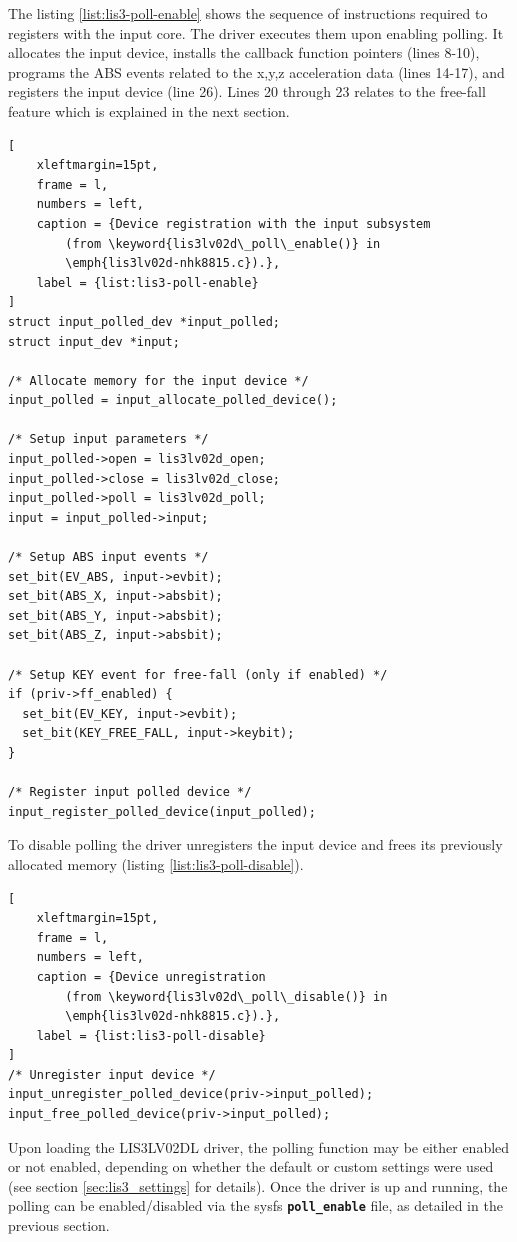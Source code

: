 \documentclass[a4paper,10pt]{article}
\newcommand{\keyword}[1]{\texttt{\textbf{#1}}}
\begin{document}
\begin{multicols}{2}
The listing \ref{list:lis3-poll-enable} shows the sequence of instructions
required to registers with the input core. The driver executes them upon
enabling polling. It allocates the input device, installs the callback
function pointers (lines 8-10), programs the ABS events related to the x,y,z
acceleration data (lines 14-17), and registers the input device (line 26).
Lines 20 through 23 relates to the free-fall feature which is explained in
the next section.

\begin{lstlisting}[
	xleftmargin=15pt,
	frame = l,
	numbers = left,
	caption = {Device registration with the input subsystem
		(from \keyword{lis3lv02d\_poll\_enable()} in
		\emph{lis3lv02d-nhk8815.c}).},
	label = {list:lis3-poll-enable}
]
struct input_polled_dev *input_polled;
struct input_dev *input;

/* Allocate memory for the input device */
input_polled = input_allocate_polled_device();

/* Setup input parameters */
input_polled->open = lis3lv02d_open;
input_polled->close = lis3lv02d_close;
input_polled->poll = lis3lv02d_poll;
input = input_polled->input;

/* Setup ABS input events */
set_bit(EV_ABS, input->evbit);
set_bit(ABS_X, input->absbit);
set_bit(ABS_Y, input->absbit);
set_bit(ABS_Z, input->absbit);

/* Setup KEY event for free-fall (only if enabled) */
if (priv->ff_enabled) {
  set_bit(EV_KEY, input->evbit);
  set_bit(KEY_FREE_FALL, input->keybit);
}

/* Register input polled device */
input_register_polled_device(input_polled);
\end{lstlisting}

To disable polling the driver unregisters the input device and frees its
previously allocated memory (listing \ref{list:lis3-poll-disable}).

\begin{lstlisting}[
	xleftmargin=15pt,
	frame = l,
	numbers = left,
	caption = {Device unregistration
		(from \keyword{lis3lv02d\_poll\_disable()} in 
		\emph{lis3lv02d-nhk8815.c}).},
	label = {list:lis3-poll-disable}
]
/* Unregister input device */
input_unregister_polled_device(priv->input_polled);
input_free_polled_device(priv->input_polled);
\end{lstlisting}

Upon loading the LIS3LV02DL driver, the polling function may be either enabled
or not enabled, depending on whether the default or custom settings were used
(see section \ref{sec:lis3_settings} for details).
Once the driver is up and running, the polling can be enabled/disabled via the
sysfs \keyword{poll\_enable} file, as detailed in the previous section.



\end{multicols}
\end{document}
